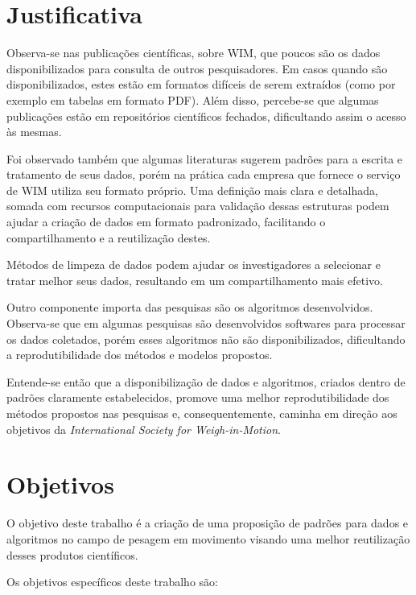 \documentclass{ufscThesis}
\begin{document}

\section{Justificativa}\label{introducao-justificativa}

Observa-se nas publicações científicas, sobre WIM, que poucos são os dados disponibilizados para consulta de outros pesquisadores. Em casos quando são disponibilizados, estes estão em formatos difíceis de serem extraídos (como por exemplo em tabelas em formato PDF). Além disso, percebe-se que algumas publicações estão em repositórios científicos fechados, dificultando assim o acesso às mesmas.

Foi observado também que algumas literaturas sugerem padrões para a escrita e tratamento de seus dados, porém na prática cada empresa que fornece o serviço de WIM utiliza seu formato próprio. Uma definição mais clara e detalhada, somada com recursos computacionais para validação dessas estruturas podem ajudar a criação de dados em formato padronizado, facilitando o compartilhamento e a reutilização destes.

Métodos de limpeza de dados podem ajudar os investigadores a selecionar e tratar melhor seus dados, resultando em um compartilhamento mais efetivo.

Outro componente importa das pesquisas são os algoritmos desenvolvidos. Observa-se que em algumas pesquisas são desenvolvidos softwares para processar os dados coletados, porém esses algoritmos não são disponibilizados, dificultando a reprodutibilidade dos métodos e modelos propostos.

Entende-se então que a disponibilização de dados e algoritmos, criados dentro de padrões claramente estabelecidos, promove uma melhor reprodutibilidade dos métodos propostos nas pesquisas e, consequentemente, caminha em direção aos objetivos da \textit{International Society for Weigh-in-Motion}.

\section{Objetivos}\label{introducao-objetivos}

O objetivo deste trabalho é a criação de uma proposição de padrões para dados e algoritmos no campo de pesagem em movimento visando uma melhor reutilização desses produtos científicos.

Os objetivos específicos deste trabalho são:
\end{document}
